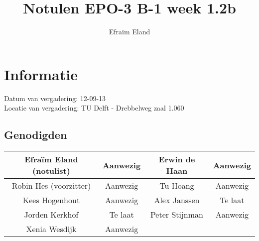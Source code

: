 \documentclass{article}
\begin{document}
\title{Notulen EPO-3 B-1 week 1.2b}%
\author{Efra\"im Eland}%
\maketitle

\section*{Informatie}
Datum van vergadering: 12-09-13\\ %
Locatie van vergadering: TU Delft - Drebbelweg zaal 1.060 %
\subsection*{Genodigden}
\begin{center}
\begin{tabular}{|c |c | c| c|}
	\hline
Efraïm Eland (notulist) & Aanwezig & Erwin de Haan & Aanwezig \\
	\hline
Robin Hes (voorzitter) & Aanwezig & Tu Hoang & Aanwezig \\
	\hline
Kees Hogenhout & Aanwezig & Alex Janssen & Te laat\\
	\hline
Jorden Kerkhof & Te laat & Peter Stijnman & Aanwezig \\
	\hline
Xenia Wesdijk & Aanwezig & & \\
	\hline
\end{tabular}
\end{center}
\end{document}
